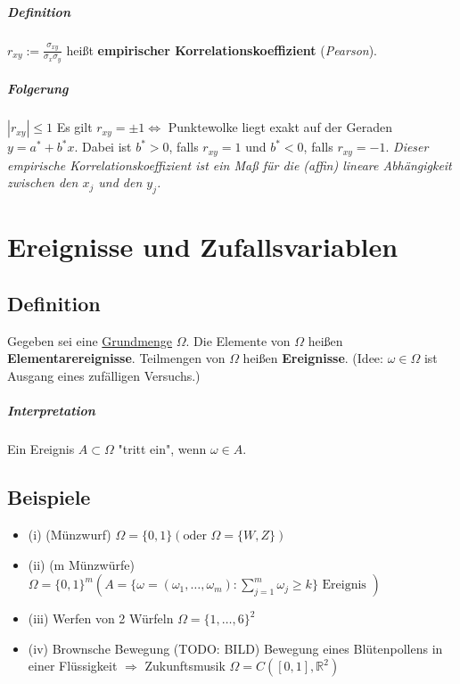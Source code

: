 \documentclass[a4paper,11pt,notitlepage]{report}
\newcommand{\R}{{\ensuremath{\mathbb{R}}}}
\begin{document}
\paragraph{Definition}
$r_{xy}:= \frac{\sigma_{xy}}{\sigma_x \sigma_y}$ heißt \textbf{empirischer Korrelationskoeffizient} (\emph{Pearson}).

\paragraph{Folgerung}
$|r_{xy}|\leq 1$
\newline
Es gilt $r_{xy} = \pm 1 \Leftrightarrow$ Punktewolke liegt exakt auf der Geraden $y=a^*+b^*x$.
Dabei ist $b^* > 0$, falls $r_{xy} = 1$ und $b^* < 0$, falls $r_{xy} = -1$.
\newline 
\emph{Dieser empirische Korrelationskoeffizient ist ein Maß für die (affin) lineare Abhängigkeit zwischen den $x_j$ und den $y_j$.}

\chapter{Ereignisse und Zufallsvariablen}

\section{Definition}
Gegeben sei eine \underline{Grundmenge} $\Omega$. Die Elemente von $\Omega$ heißen \textbf{Elementarereignisse}. Teilmengen von $\Omega$ heißen \textbf{Ereignisse}. (Idee: $\omega \in \Omega$ ist Ausgang eines zufälligen Versuchs.)

\paragraph{Interpretation}
Ein Ereignis $A \subset \Omega$ "tritt ein", wenn $\omega \in A$.

\section{Beispiele}
\begin{itemize}
	\item (i) (Münzwurf) \newline
		$\Omega = \{0,1\} (\text{oder } \Omega = \{W,Z\})$
	\item (ii) (m Münzwürfe) \newline
		$\Omega = \{0,1\}^m (A = \{\omega = (\omega_1, \ldots, \omega_m) : \sum\limits_{j=1}^{m}{\omega_j} \geq k\} \text{ Ereignis })$
	\item (iii) Werfen von 2 Würfeln \newline
		$\Omega = \{1, \ldots, 6\}^2$
	\item (iv) Brownsche Bewegung \newline
		(TODO: BILD) Bewegung eines Blütenpollens in einer Flüssigkeit
		\newline
		$\Rightarrow$ Zukunftsmusik
		\newline
		$\Omega = C([0,1], \R^2)$
\end{itemize}
\end{document}
